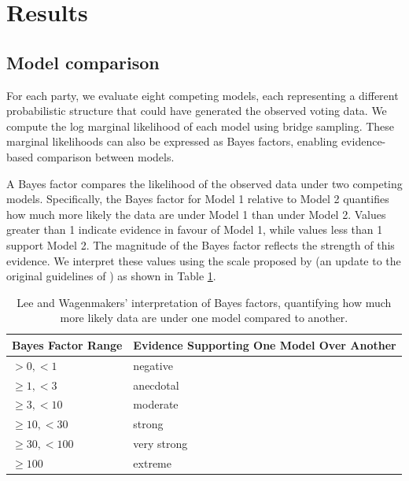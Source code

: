 \documentclass[webpdf,large,contemporary,namedate]{oup-authoring-template}
\theoremstyle{thmstyleone}
\theoremstyle{thmstyletwo}
\theoremstyle{thmstylethree}
\begin{document}
\section{Results}\label{results}

\subsection{Model comparison}\label{model-comparison}

For each party, we evaluate eight competing models, each representing a
different probabilistic structure that could have generated the observed
voting data. We compute the log marginal likelihood of each model using
bridge sampling. These marginal likelihoods can also be expressed as
Bayes factors, enabling evidence-based comparison between models.

A Bayes factor compares the likelihood of the observed data under two
competing models. Specifically, the Bayes factor for Model 1 relative to
Model 2 quantifies how much more likely the data are under Model 1 than
under Model 2. Values greater than 1 indicate evidence in favour of
Model 1, while values less than 1 support Model 2. The magnitude of the
Bayes factor reflects the strength of this evidence. We interpret these
values using the scale proposed by \citet{Lee2014} (an update to the
original guidelines of \citet{jeffreys1939}) as shown in Table
\ref{tab:tablewagenmakers}.

\begin{table}

\caption{\label{tab:tablewagenmakers}Lee and Wagenmakers' interpretation of Bayes factors, quantifying how much more likely data are under one model compared to another.}
\centering
\fontsize{8}{10}\selectfont
\begin{tabular}[t]{l|l}
\hline
Bayes Factor Range & Evidence Supporting One Model Over Another\\
\hline
$> 0, < 1$ & negative\\
\hline
$\geq 1, < 3$ & anecdotal\\
\hline
$\geq 3, < 10$ & moderate\\
\hline
$\geq 10, < 30$ & strong\\
\hline
$\geq 30, < 100$ & very strong\\
\hline
$\geq 100$ & extreme\\
\hline
\end{tabular}
\end{table}
\end{document}
